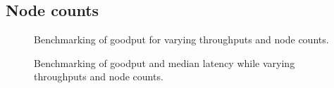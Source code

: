 

\subsection{Node counts} \label{nodecountseval}

\begin{figure}[h!]
\centering
\resizebox{.6\textwidth}{!}{}
\caption{Benchmarking of goodput for varying throughputs and node counts.}
\label{throughputgoodputnodes}
\end{figure}

\begin{figure}[h!]
\centering
\resizebox{.6\textwidth}{!}{}
\caption{Benchmarking of goodput and median latency while varying throughputs and node counts.}
\label{goodputlatencynodes}
\end{figure}

% 

